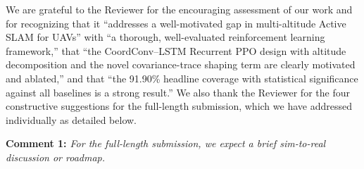 \documentclass[10pt]{article}
\begin{document}
\vspace{1em}

\vspace{0.5em}

\hspace{-0.7cm} We are grateful to the Reviewer for the encouraging assessment of our work and for recognizing that it ``addresses a well-motivated gap in multi-altitude Active SLAM for UAVs'' with ``a thorough, well-evaluated reinforcement learning framework,'' that ``the CoordConv--LSTM Recurrent PPO design with altitude decomposition and the novel covariance-trace shaping term are clearly motivated and ablated,'' and that ``the 91.90\% headline coverage with statistical significance against all baselines is a strong result.'' We also thank the Reviewer for the four constructive suggestions for the full-length submission, which we have addressed individually as detailed below.

\hspace{-0.7cm} {\bf Comment 1:}{\it{ For the full-length submission, we expect a brief sim-to-real discussion or roadmap.
}}
\end{document}

